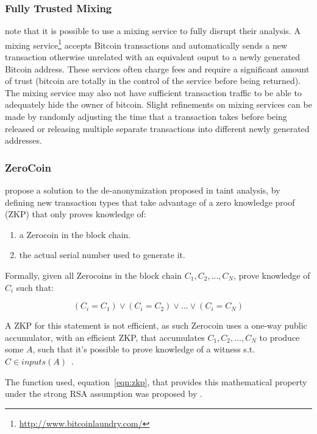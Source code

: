 \subsubsection{Fully Trusted Mixing}
\textcite{eval-priv} note that it is possible to use a mixing service to fully disrupt their analysis.  A mixing service\footnote{\url{http://www.bitcoinlaundry.com/}} accepts Bitcoin transactions and automatically sends a new transaction otherwise unrelated with an equivalent ouput to a newly generated Bitcoin address.  These services often charge fees and require a significant amount of trust (bitcoin are totally in the control of the service before being returned).  The mixing service may also not have sufficient transaction traffic to be able to adequately hide the owner of bitcoin. Slight refinements on mixing services can be made by randomly adjusting the time that a transaction takes before being released or releasing multiple separate transactions into different newly generated addresses.

\subsubsection{ZeroCoin}
\textcite{zerocoin} propose a solution to the de-anonymization proposed in taint analysis, by defining new transaction types that take advantage of a zero knowledge proof (ZKP) that only proves knowledge of:

\begin{enumerate}
\item a Zerocoin in the block chain.
\item the actual serial number used to generate it.
\end{enumerate}

Formally, given all Zerocoins in the block chain ${C_1, C_2,\dots,C_N}$, prove knowledge of $C_i$ such that:

\begin{equation}
    (C_i = C_1) \vee (C_i=C_2) \vee \dots \vee (C_i=C_N)
\end{equation}

A ZKP for this statement is not efficient, as such Zerocoin uses a one-way public accumulator, with an efficient ZKP, that accumulates ${C_1, C_2,\dots,C_N}$ to produce some $A$, such that it's possible to prove knowledge of a witness s.t. $C \in inputs(A)$~\cite{one-way-accumulators}.

The function used, equation~\ref{eqn:zkp}, that provides this mathematical property under the strong RSA assumption was proposed by \textcite{strong-rsa}.

